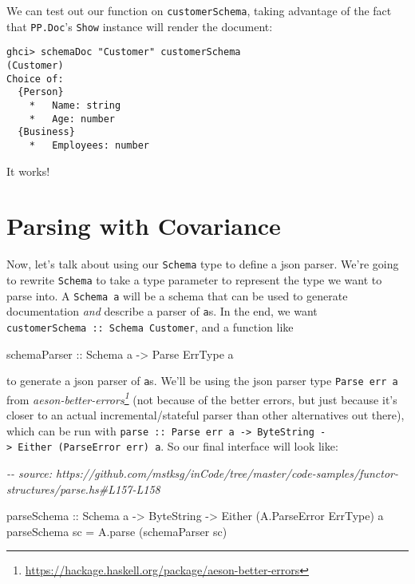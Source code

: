 \documentclass[]{article}
\newenvironment{Shaded}{}{}
\newcommand{\CommentTok}[1]{\textcolor[rgb]{0.38,0.63,0.69}{\textit{#1}}}
\newcommand{\DataTypeTok}[1]{\textcolor[rgb]{0.56,0.13,0.00}{#1}}
\newcommand{\NormalTok}[1]{#1}
\newcommand{\OtherTok}[1]{\textcolor[rgb]{0.00,0.44,0.13}{#1}}
\renewcommand{\href}[2]{#2\footnote{\url{#1}}}
\begin{document}
We can test out our function on \texttt{customerSchema}, taking advantage of the
fact that \texttt{PP.Doc}'s \texttt{Show} instance will render the document:

\begin{verbatim}
ghci> schemaDoc "Customer" customerSchema
(Customer)
Choice of:
  {Person}
    *   Name: string
    *   Age: number
  {Business}
    *   Employees: number
\end{verbatim}

It works!

\hypertarget{parsing-with-covariance}{%
\section{Parsing with Covariance}\label{parsing-with-covariance}}

Now, let's talk about using our \texttt{Schema} type to define a json parser.
We're going to rewrite \texttt{Schema} to take a type parameter to represent the
type we want to parse into. A \texttt{Schema\ a} will be a schema that can be
used to generate documentation \emph{and} describe a parser of \texttt{a}s. In
the end, we want \texttt{customerSchema\ ::\ Schema\ Customer}, and a function
like

\begin{Shaded}
\begin{Highlighting}[]
\OtherTok{schemaParser ::} \DataTypeTok{Schema}\NormalTok{ a }\OtherTok{{-}>} \DataTypeTok{Parse} \DataTypeTok{ErrType}\NormalTok{ a}
\end{Highlighting}
\end{Shaded}

to generate a json parser of \texttt{a}s. We'll be using the json parser type
\texttt{Parse\ err\ a} from
\emph{\href{https://hackage.haskell.org/package/aeson-better-errors}{aeson-better-errors}}
(not because of the better errors, but just because it's closer to an actual
incremental/stateful parser than other alternatives out there), which can be run
with
\texttt{parse\ ::\ Parse\ err\ a\ -\textgreater{}\ ByteString\ -\textgreater{}\ Either\ (ParseError\ err)\ a}.
So our final interface will look like:

\begin{Shaded}
\begin{Highlighting}[]
\CommentTok{{-}{-} source: https://github.com/mstksg/inCode/tree/master/code{-}samples/functor{-}structures/parse.hs\#L157{-}L158}

\OtherTok{parseSchema ::} \DataTypeTok{Schema}\NormalTok{ a }\OtherTok{{-}>} \DataTypeTok{ByteString} \OtherTok{{-}>} \DataTypeTok{Either}\NormalTok{ (}\DataTypeTok{A.ParseError} \DataTypeTok{ErrType}\NormalTok{) a}
\NormalTok{parseSchema sc }\OtherTok{=}\NormalTok{ A.parse (schemaParser sc)}
\end{Highlighting}
\end{Shaded}
\end{document}
